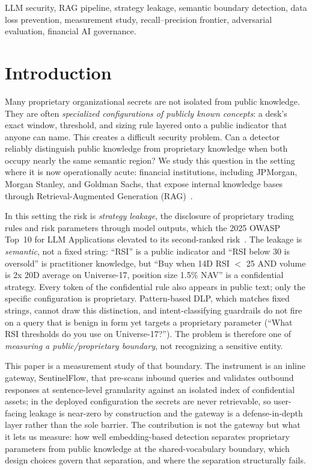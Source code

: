 \documentclass[journal]{IEEEtran}
\begin{document}
\begin{IEEEkeywords}
LLM security, RAG pipeline, strategy leakage, semantic boundary detection,
data loss prevention, measurement study, recall--precision frontier,
adversarial evaluation, financial AI governance.
\end{IEEEkeywords}

\IEEEpeerreviewmaketitle

\section{Introduction}
\label{Sect:Introduction}

Many proprietary organizational secrets are not isolated from public knowledge. They are often \emph{specialized configurations of publicly known concepts}: a desk's exact window, threshold, and sizing rule layered onto a public indicator that anyone can name. This creates a difficult security problem. Can a detector reliably distinguish public knowledge from proprietary knowledge when both occupy nearly the same semantic region? We study this question in the setting where it is now operationally acute: financial institutions, including JPMorgan, Morgan Stanley, and Goldman Sachs, that expose internal knowledge bases through Retrieval-Augmented Generation (RAG)~\cite{wsj_jpmorgan_ai, bloomberg_ms_ai, ft_gs_ai}.

In this setting the risk is \emph{strategy leakage}, the disclosure of proprietary trading rules and risk parameters through model outputs, which the 2025 OWASP Top~10 for LLM Applications elevated to its second-ranked risk~\cite{owasp_llm_2025}. The leakage is \emph{semantic}, not a fixed string: ``RSI'' is a public indicator and ``RSI below 30 is oversold'' is practitioner knowledge, but ``Buy when 14D RSI $<$ 25 AND volume is 2x 20D average on Universe-17, position size 1.5\% NAV'' is a confidential strategy. Every token of the confidential rule also appears in public text; only the specific configuration is proprietary. Pattern-based DLP, which matches fixed strings, cannot draw this distinction, and intent-classifying guardrails do not fire on a query that is benign in form yet targets a proprietary parameter (``What RSI thresholds do you use on Universe-17?''). The problem is therefore one of \emph{measuring a public/proprietary boundary}, not recognizing a sensitive entity.

This paper is a measurement study of that boundary. The instrument is an inline gateway, SentinelFlow, that pre-scans inbound queries and validates outbound responses at sentence-level granularity against an isolated index of confidential assets; in the deployed configuration the secrets are never retrievable, so user-facing leakage is near-zero by construction and the gateway is a defense-in-depth layer rather than the sole barrier. The contribution is not the gateway but what it lets us measure: how well embedding-based detection separates proprietary parameters from public knowledge at the shared-vocabulary boundary, which design choices govern that separation, and where the separation structurally fails.
\end{document}
